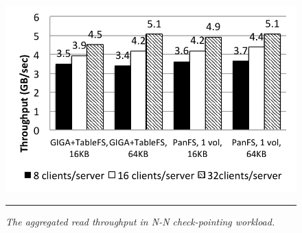 \begin{figure}[t]  %
\centerline{\includegraphics[scale=0.7]{./figs/checkpointing_read}}
\vspace{10pt}
\caption{\normalsize
\textit{
The aggregated read throughput in N-N check-pointing workload.
}
}
\vspace{10pt}
\hrule
\label{graph:checkpoint_read}
\end{figure}       %

